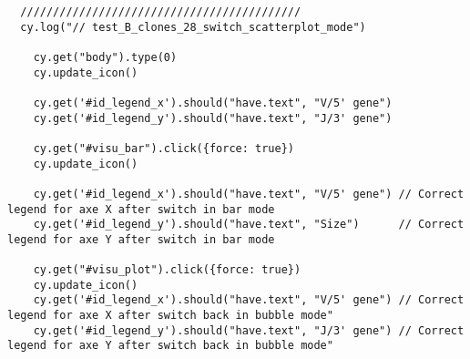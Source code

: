 \begin{verbatim}
  ///////////////////////////////////////////
  cy.log("// test_B_clones_28_switch_scatterplot_mode")

    cy.get("body").type(0)
    cy.update_icon()

    cy.get('#id_legend_x').should("have.text", "V/5' gene")
    cy.get('#id_legend_y').should("have.text", "J/3' gene")

    cy.get("#visu_bar").click({force: true})
    cy.update_icon()

    cy.get('#id_legend_x').should("have.text", "V/5' gene") // Correct legend for axe X after switch in bar mode
    cy.get('#id_legend_y').should("have.text", "Size")      // Correct legend for axe Y after switch in bar mode

    cy.get("#visu_plot").click({force: true})
    cy.update_icon()
    cy.get('#id_legend_x').should("have.text", "V/5' gene") // Correct legend for axe X after switch back in bubble mode"
    cy.get('#id_legend_y').should("have.text", "J/3' gene") // Correct legend for axe Y after switch back in bubble mode"


\end{verbatim}


